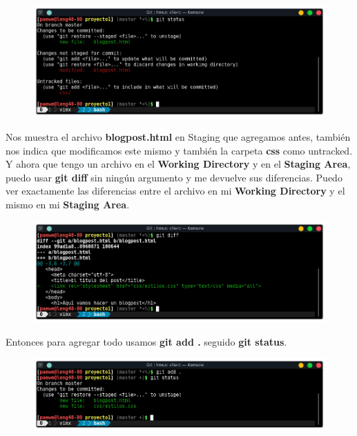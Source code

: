 \documentclass{article}
\begin{document}
\begin{figure}[h!]
  \centering
  \includegraphics[scale=0.75]{./Pictures/111_status.png}
\end{figure}

Nos muestra el archivo \textbf{blogpost.html} en Staging que agregamos antes,
también nos indica que modificamos este mismo y también la carpeta \textbf{css}
como untracked.\\

Y ahora que tengo un archivo en el \textbf{Working Directory} y en el
\textbf{Staging Area}, puedo usar \textbf{git diff} sin ningún argumento y me
devuelve sus diferencias. Puedo ver exactamente las diferencias entre el
archivo en mi \textbf{Working Directory} y el mismo en mi \textbf{Staging
Area}.

\begin{figure}[h!]
  \centering
  \includegraphics[scale=0.75]{./Pictures/112_git_diff.png}
\end{figure}

Entonces para agregar todo usamos \textbf{git add .} seguido \textbf{git
status}.

\begin{figure}[h!]
  \centering
  \includegraphics[scale=0.75]{./Pictures/113_add_status.png}
\end{figure}
\end{document}
